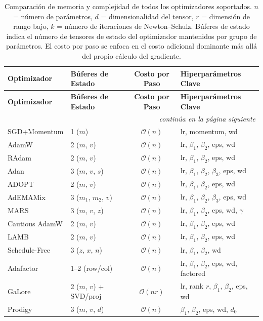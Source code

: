 \documentclass[11pt,a4paper]{article}
\begin{document}
\begin{longtable}{llcl}
\toprule
\textbf{Optimizador} & \textbf{Búferes de Estado} & \textbf{Costo por Paso} & \textbf{Hiperparámetros Clave} \\
\midrule
\endfirsthead
\toprule
\textbf{Optimizador} & \textbf{Búferes de Estado} & \textbf{Costo por Paso} & \textbf{Hiperparámetros Clave} \\
\midrule
\endhead
\midrule
\multicolumn{4}{r}{\textit{continúa en la página siguiente}} \\
\endfoot
\bottomrule
\caption{Comparación de memoria y complejidad de todos los optimizadores soportados. $n$ = número de parámetros, $d$ = dimensionalidad del tensor, $r$ = dimensión de rango bajo, $k$ = número de iteraciones de Newton--Schulz. Búferes de estado indica el número de tensores de estado del optimizador mantenidos por grupo de parámetros. El costo por paso se enfoca en el costo adicional dominante más allá del propio cálculo del gradiente.}
\label{tab:optimizer-complexity}
\endlastfoot
SGD+Momentum & 1 ($m$) & $\mathcal{O}(n)$ & lr, momentum, wd \\
AdamW & 2 ($m$, $v$) & $\mathcal{O}(n)$ & lr, $\beta_1$, $\beta_2$, eps, wd \\
RAdam & 2 ($m$, $v$) & $\mathcal{O}(n)$ & lr, $\beta_1$, $\beta_2$, eps, wd \\
Adan & 3 ($m$, $v$, $s$) & $\mathcal{O}(n)$ & lr, $\beta_1$, $\beta_2$, $\beta_3$, eps, wd \\
ADOPT & 2 ($m$, $v$) & $\mathcal{O}(n)$ & lr, $\beta_1$, $\beta_2$, eps, wd \\
AdEMAMix & 3 ($m_1$, $m_2$, $v$) & $\mathcal{O}(n)$ & lr, $\beta_1$, $\beta_2$, $\beta_3$, eps, wd \\
MARS & 3 ($m$, $v$, $z$) & $\mathcal{O}(n)$ & lr, $\beta_1$, $\beta_2$, eps, wd, $\gamma$ \\
Cautious AdamW & 2 ($m$, $v$) & $\mathcal{O}(n)$ & lr, $\beta_1$, $\beta_2$, eps, wd \\
LAMB & 2 ($m$, $v$) & $\mathcal{O}(n)$ & lr, $\beta_1$, $\beta_2$, eps, wd \\
Schedule-Free & 3 ($z$, $x$, $n$) & $\mathcal{O}(n)$ & lr, $\beta_1$, $\beta_2$, wd \\
Adafactor & 1--2 (row/col) & $\mathcal{O}(n)$ & lr, $\beta_1$, $\beta_2$, eps, wd, factored \\
GaLore & 2 ($m$, $v$) + SVD/proj & $\mathcal{O}(nr)$ & lr, rank $r$, $\beta_1$, $\beta_2$, eps, wd \\
Prodigy & 3 ($m$, $v$, $d$) & $\mathcal{O}(n)$ & $\beta_1$, $\beta_2$, eps, wd, $d_0$ \\

\end{longtable}
\end{document}

